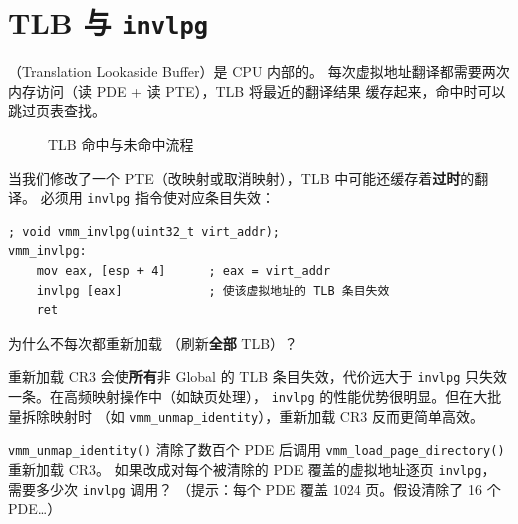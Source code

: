 \section{TLB 与 \texttt{invlpg}}

（Translation Lookaside Buffer）是 CPU 内部的。
每次虚拟地址翻译都需要两次内存访问（读 PDE + 读 PTE），TLB 将最近的翻译结果
缓存起来，命中时可以跳过页表查找。

\begin{figure}[H]
  \centering
  
  \caption{TLB 命中与未命中流程}
  \label{fig:tlb-flow}
\end{figure}

当我们修改了一个 PTE（改映射或取消映射），TLB 中可能还缓存着\textbf{过时}的翻译。
必须用 \texttt{invlpg} 指令使对应条目失效：

\begin{lstlisting}[style=nasmstyle]
; void vmm_invlpg(uint32_t virt_addr);
vmm_invlpg:
    mov eax, [esp + 4]      ; eax = virt_addr
    invlpg [eax]            ; 使该虚拟地址的 TLB 条目失效
    ret
\end{lstlisting}

\begin{whybox}
为什么不每次都重新加载 （刷新\textbf{全部} TLB）？

重新加载 CR3 会使\textbf{所有}非 Global 的 TLB 条目失效，代价远大于
\texttt{invlpg} 只失效一条。在高频映射操作中（如缺页处理），
\texttt{invlpg} 的性能优势很明显。但在大批量拆除映射时
（如 \texttt{vmm\_unmap\_identity}），重新加载 CR3 反而更简单高效。
\end{whybox}

\begin{thinkbox}
\texttt{vmm\_unmap\_identity()} 清除了数百个 PDE 后调用
\texttt{vmm\_load\_page\_directory()} 重新加载 CR3。
如果改成对每个被清除的 PDE 覆盖的虚拟地址逐页 \texttt{invlpg}，
需要多少次 \texttt{invlpg} 调用？
（提示：每个 PDE 覆盖 1024 页。假设清除了 16 个 PDE\ldots）
\end{thinkbox}


